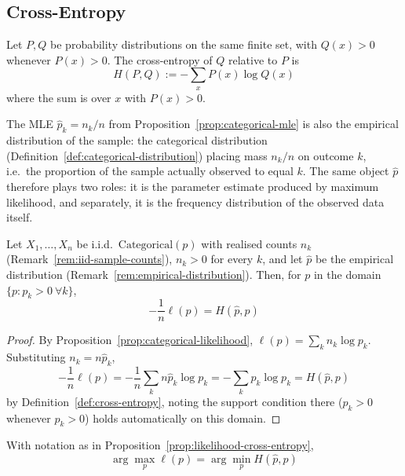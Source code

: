 	\subsection{Cross-Entropy}
		
		\begin{definition}
			\label{def:cross-entropy}
			Let $P,Q$ be probability distributions on the same finite set, with $Q(x)>0$ whenever $P(x)>0$. The cross-entropy of $Q$ relative to $P$ is
			\[
				H(P,Q) := -\sum_x P(x)\log Q(x)
			\]
			where the sum is over $x$ with $P(x)>0$.
		\end{definition}
		
		\begin{remark}
			\label{rem:empirical-distribution}
			The MLE $\hat p_k=n_k/n$ from Proposition~\ref{prop:categorical-mle} is also the empirical distribution of the sample: the categorical distribution (Definition~\ref{def:categorical-distribution}) placing mass $n_k/n$ on outcome $k$, i.e.\ the proportion of the sample actually observed to equal $k$. The same object $\hat p$ therefore plays two roles: it is the parameter estimate produced by maximum likelihood, and separately, it is the frequency distribution of the observed data itself.
		\end{remark}
		
		\begin{proposition}
			\label{prop:likelihood-cross-entropy}
			Let $X_1,\dots,X_n$ be i.i.d.\ $\mathrm{Categorical}(p)$ with realised counts $n_k$ (Remark~\ref{rem:iid-sample-counts}), $n_k>0$ for every $k$, and let $\hat p$ be the empirical distribution (Remark~\ref{rem:empirical-distribution}). Then, for $p$ in the domain $\{p:p_k>0\ \forall k\}$,
			\[
				-\frac{1}{n}\ell(p) = H(\hat p, p)
			\]
		\end{proposition}
		
		\begin{proof}
			By Proposition~\ref{prop:categorical-likelihood}, $\ell(p)=\sum_kn_k\log p_k$. Substituting $n_k=n\hat p_k$,
			\[
				-\frac{1}{n}\ell(p) = -\frac{1}{n}\sum_k n\hat p_k\log p_k = -\sum_k\hat p_k\log p_k = H(\hat p,p)
			\]
			by Definition~\ref{def:cross-entropy}, noting the support condition there ($p_k>0$ whenever $\hat p_k>0$) holds automatically on this domain.
		\end{proof}
		
		\begin{corollary}
			\label{cor:mle-min-cross-entropy}
			With notation as in Proposition~\ref{prop:likelihood-cross-entropy},
			\[
				\arg\max_p \ell(p) = \arg\min_p H(\hat p,p)
			\]
		\end{corollary}
		
